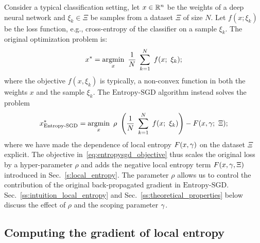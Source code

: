 \documentclass[10pt]{article}
\newcommand{\entropysgd}{\mathrm{Entropy}\textrm{-}\mathrm{SGD}}
\begin{document}
Consider a typical classification setting, let $x \in \mathbb{R}^n$ be the weights of a deep neural network and $\xi_k \in \Xi$ be samples from a dataset $\Xi$ of size $N$. Let $f(x; \xi_k)$ be the loss function, e.g., cross-entropy of the classifier on a sample $\xi_k$. The original optimization problem is:
\begin{equation}
    x^* = \operatorname*{argmin}_x\ \frac{1}{N}\ \sum_{k=1}^N\ f(x;\ \xi_k);
    \label{eq:dnn_objective}
\end{equation}
where the objective $f(x, \xi_k)$ is typically, a non-convex function in both the weights $x$ and the sample $\xi_k$. The $\entropysgd$ algorithm instead solves the problem
\begin{equation}
    x^*_{\entropysgd} = \argmin_x\ \r\ \rbrac{\f{1}{N}\ \sum_{k=1}^N\ f(x;\ \xi_k)} - F(x, \gamma;\ \Xi);
    \label{eq:entropysgd_objective}
\end{equation}
where we have made the dependence of local entropy $F(x,\gamma)$ on the dataset $\Xi$ explicit. The objective in~\eqref{eq:entropysgd_objective} thus scales the original loss by a hyper-parameter $\rho$ and adds the negative local entropy term $F(x, \gamma, \Xi)$ introduced in Sec.~\ref{s:local_entropy}. The parameter $\rho$ allows us to control the contribution of the original back-propagated gradient in $\entropysgd$. Sec.~\ref{ss:intuition_local_entropy} and Sec.~\ref{ss:theoretical_properties} below discuss the effect of $\rho$ and the scoping parameter $\gamma$.

\subsection{Computing the gradient of local entropy}
\label{ss:grad_local_entropy}
\end{document}
